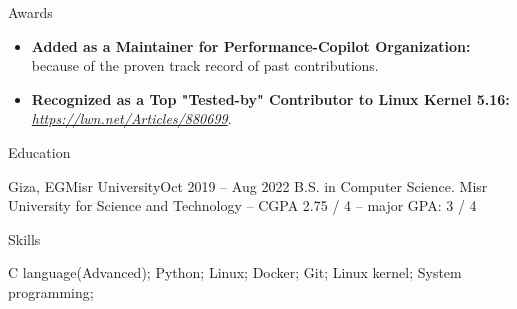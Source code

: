 \documentclass[]{Sohaib-Mohamed}
\begin{document}
\begin{cvsection}{Awards}
   \begin{cvsubsection}{}{}{}
      \begin{itemize}
         \item \textbf{Added as a Maintainer for Performance-Copilot Organization:} because of the proven track record of past contributions.
         \item \textbf{Recognized as a Top "Tested-by" Contributor to Linux Kernel 5.16:} \href{https://lwn.net/Articles/880699/}{\textit{https://lwn.net/Articles/880699}}.
      \end{itemize}
   \end{cvsubsection}
\end{cvsection}


\begin{cvsection}{Education}
   \begin{cvsubsection}{Giza, EG}{Misr University}{Oct 2019 -- Aug 2022}
      B.S. in Computer Science. Misr University for Science and Technology -- CGPA 2.75 / 4 -- major GPA: 3 / 4
   \end{cvsubsection}
\end{cvsection}


\begin{cvsection}{Skills}
   \begin{cvsubsection}{}{}{}
      C language(Advanced); Python; Linux; Docker; Git; Linux kernel; System programming;
   \end{cvsubsection}
\end{cvsection}
\end{document}
